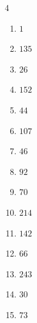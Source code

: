 \begin{multicols}{4}
\begin{enumerate}

  \item $1$


  \item $135$


  \item $26$


  \item $152$


  \item $44$


  \item $107$


  \item $46$


  \item $92$


  \item $70$


  \item $214$


\columnbreak %

\resetques

  \item $142$


  \item $66$


  \item $243$


  \item $30$


  \item $73$


\end{enumerate}
\end{multicols}
